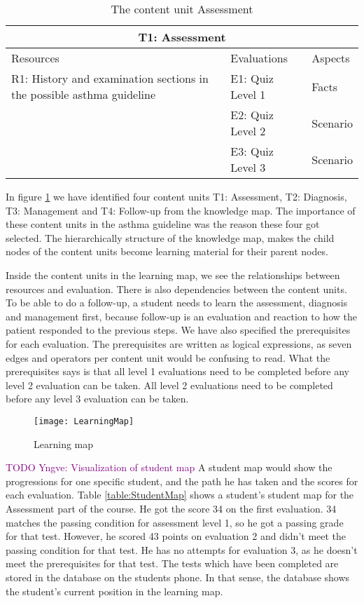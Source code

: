 \begin{table}[h!]
	\caption{The content unit Assessment}
	\label{table:ContentUnit}
\begin{tabular}{ | m{16em} | m{10em}| m{6em} | } 
	\hline
	\multicolumn{3}{c}{\bfseries T1: Assessment} \\
	\hline
	Resources & Evaluations & Aspects \\
	\hline
	R1: History and examination sections in the possible asthma guideline \parencite{RepublicofKeny2016} & E1: Quiz Level 1 & Facts \\
	& E2: Quiz Level 2 & Scenario \\
	& E3: Quiz Level 3 & Scenario \\
	\hline
	\end{tabular}
\end{table}

In figure \ref{fig:LearningMap} we have identified four content units T1: Assessment, T2: Diagnosis, T3: Management and T4: Follow-up from the knowledge map. The importance of these content units in the asthma guideline \parencite{RepublicofKeny2016} was the reason these four got selected. The hierarchically structure of the knowledge map, makes the child nodes of the content units become learning material for their parent nodes.

Inside the content units in the learning map, we see the relationships between resources and evaluation. There is also dependencies between the content units. To be able to do a follow-up, a student needs to learn the assessment, diagnosis and management first, because follow-up is an evaluation and reaction to how the patient responded to the previous steps.  We have also specified the prerequisites for each evaluation. The prerequisites are written as logical expressions, as seven edges and operators per content unit would be confusing to read. What the prerequisites says is that all level 1 evaluations need to be completed before any level 2 evaluation can be taken. All level 2 evaluations need to be completed before any level 3 evaluation can be taken.

\begin{figure}[h!]
	\caption {Learning map}
	\label{fig:LearningMap}
	\texttt{[image: LearningMap]}
\end{figure}
\textcolor{purple}{TODO Yngve: Visualization of student map}
A student map would show the progressions for one specific student, and the path he has taken and the scores for each evaluation. Table \ref{table:StudentMap} shows a student's student map for the Assessment part of the course. He got the score 34 on the first evaluation. 34 matches the passing condition for assessment level 1, so he got a passing grade for that test. However, he scored 43 points on evaluation 2 and didn't meet the passing condition for that test. He has no attempts for evaluation 3, as he doesn't meet the prerequisites for that test.  The tests which have been completed are stored in the database on the students phone. In that sense, the database shows the student's current position in the learning map.

